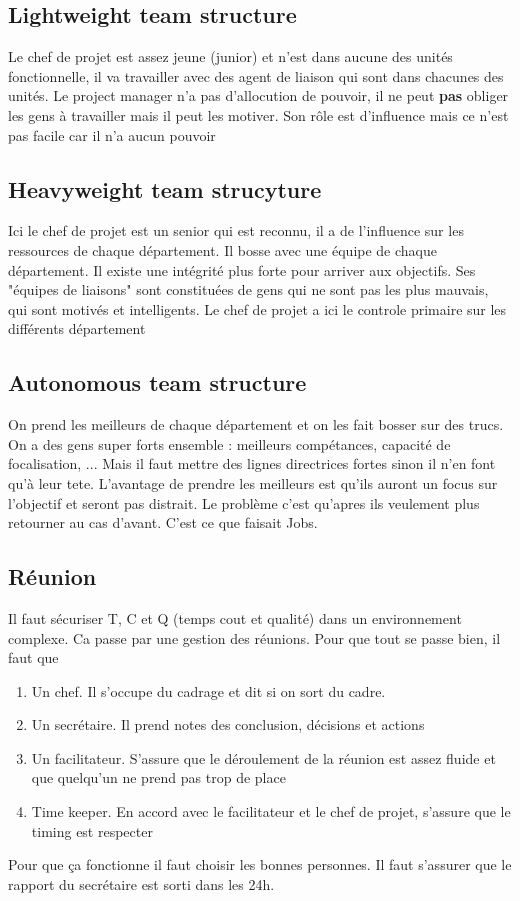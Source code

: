 \subsection{Lightweight team structure}
Le chef de projet est assez jeune (junior) et n'est dans aucune des unités fonctionnelle, il va travailler avec 
des agent de liaison qui sont dans chacunes des unités.  Le project manager n'a pas d'allocution de pouvoir, 
il ne peut \textbf{pas} obliger les gens à travailler mais il peut les motiver. Son rôle est d'influence mais ce n'est pas facile car il n'a aucun pouvoir


\subsection{Heavyweight team strucyture}
Ici le chef de projet est un senior qui est reconnu, il a de l'influence sur les ressources de chaque département. Il bosse avec une équipe de chaque département. Il existe une intégrité plus forte pour arriver aux objectifs. Ses "équipes de liaisons" sont constituées de gens qui ne sont pas les plus mauvais, qui sont motivés et intelligents. Le chef de projet a ici le controle primaire sur les différents département

\subsection{Autonomous team structure}
On prend les meilleurs de chaque département et on les fait bosser sur des trucs. On a des gens super forts ensemble : meilleurs compétances, capacité de focalisation, ... Mais il faut mettre des lignes directrices fortes sinon il n'en font qu'à leur tete. L'avantage de prendre les meilleurs est qu'ils auront un focus sur l'objectif et seront pas distrait. Le problème c'est qu'apres ils veulement plus retourner au cas d'avant. C'est ce que faisait Jobs. 


\subsection{Réunion}
Il faut sécuriser T, C et Q (temps cout et qualité) dans un environnement complexe. Ca passe par une gestion des réunions. Pour que tout se passe bien, il faut que
\begin{enumerate}
\item Un chef. Il s'occupe du cadrage et dit si on sort du cadre. 
\item Un secrétaire. Il prend notes des conclusion, décisions et actions
\item Un facilitateur. S'assure que le déroulement de la réunion est assez fluide et que quelqu'un ne prend 
pas trop de place
\item Time keeper. En accord avec le facilitateur et le chef de projet, s'assure que le timing est respecter
\end{enumerate}
Pour que ça fonctionne 	il faut choisir les bonnes personnes. Il faut s'assurer que le rapport du secrétaire est sorti dans les 24h. 


